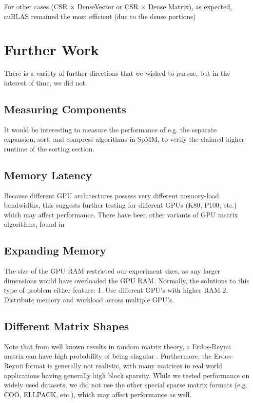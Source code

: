 \documentclass[12pt]{article}
\begin{document}
For other cases (CSR $\times$ DenseVector or CSR $\times$ Dense Matrix), as expected, cuBLAS remained the most efficient (due to the dense portions)

\section{Further Work}
There is a variety of further directions that we wished to pursue, but in the interest of time, we did not. 
\subsection{Measuring Components}
It would be interesting to measure the performance of e.g. the separate expansion, sort, and compress algorithms in SpMM, to verify the claimed higher runtime of the sorting section.

\subsection{Memory Latency}
Because different GPU architectures possess very different memory-load bandwidths, this suggests further testing for different GPUs (K80, P100, etc.) which may affect performance. There have been other variants of GPU matrix algorithms, found in 

\subsection{Expanding Memory}
The size of the GPU RAM restricted our experiment sizes, as any larger dimensions would have overloaded the GPU RAM. Normally, the solutions to this type of problem either feature: 1. Use different GPU's with higher RAM 2. Distribute memory and workload across multiple GPU's.

\subsection{Different Matrix Shapes}
Note that from well known results in random matrix theory, a Erdos-Reynii matrix can have high probability of being singular \cite{singular}. Furthermore, the Erdos-Reynii format is generally not realistic, with many matrices in real world applications having generally high block sparsity. While we tested performance on widely used datasets, we did not use the other special sparse matrix formats (e.g. COO, ELLPACK, etc.), which may affect performance as well.   


\newpage
\end{document}
